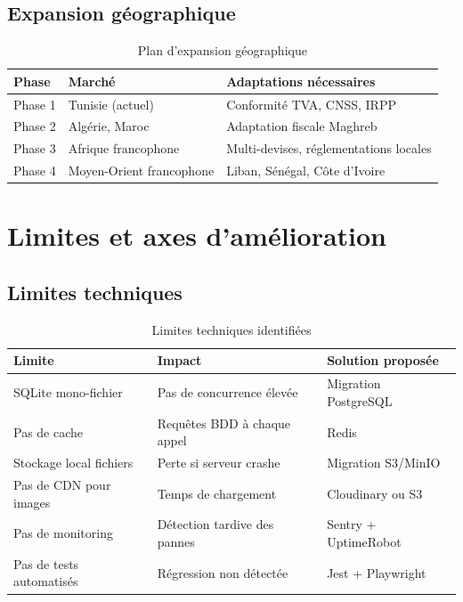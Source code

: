 \subsection{Expansion géographique}

\begin{table}[H]
\centering
\caption{Plan d'expansion géographique}
\label{tab:expansion}
\begin{tabular}{|l|l|l|}
\hline
\textbf{Phase} & \textbf{Marché} & \textbf{Adaptations nécessaires} \\
\hline
Phase 1 & Tunisie (actuel) & Conformité TVA, CNSS, IRPP \\
\hline
Phase 2 & Algérie, Maroc & Adaptation fiscale Maghreb \\
\hline
Phase 3 & Afrique francophone & Multi-devises, réglementations locales \\
\hline
Phase 4 & Moyen-Orient francophone & Liban, Sénégal, Côte d'Ivoire \\
\hline
\end{tabular}
\end{table}

\section{Limites et axes d'amélioration}

\subsection{Limites techniques}

\begin{table}[H]
\centering
\caption{Limites techniques identifiées}
\label{tab:limits-tech}
\begin{tabular}{|l|l|l|}
\hline
\textbf{Limite} & \textbf{Impact} & \textbf{Solution proposée} \\
\hline
SQLite mono-fichier & Pas de concurrence élevée & Migration PostgreSQL \\
\hline
Pas de cache & Requêtes BDD à chaque appel & Redis \\
\hline
Stockage local fichiers & Perte si serveur crashe & Migration S3/MinIO \\
\hline
Pas de CDN pour images & Temps de chargement & Cloudinary ou S3 \\
\hline
Pas de monitoring & Détection tardive des pannes & Sentry + UptimeRobot \\
\hline
Pas de tests automatisés & Régression non détectée & Jest + Playwright \\
\hline
\end{tabular}
\end{table}

